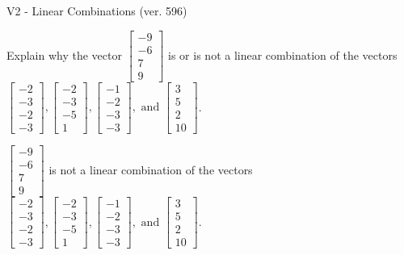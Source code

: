 \begin{exercise}
  \begin{exerciseTitle}V2 - Linear Combinations (ver. 596)\end{exerciseTitle}
  \begin{exerciseStatement}
    Explain why the vector \(\left[\begin{array}{c}
-9 \\
-6 \\
7 \\
9
\end{array}\right]\)  is or is not a linear 
	combination of the vectors \(\left[\begin{array}{c}
-2 \\
-3 \\
-2 \\
-3
\end{array}\right] , \left[\begin{array}{c}
-2 \\
-3 \\
-5 \\
1
\end{array}\right] , \left[\begin{array}{c}
-1 \\
-2 \\
-3 \\
-3
\end{array}\right] , \text{ and } \left[\begin{array}{c}
3 \\
5 \\
2 \\
10
\end{array}\right]\).
	


  \end{exerciseStatement}
  \begin{exerciseAnswer}
   \(\left[\begin{array}{c}
-9 \\
-6 \\
7 \\
9
\end{array}\right]\) 
  	 is not  
	a linear combination of the vectors \(\left[\begin{array}{c}
-2 \\
-3 \\
-2 \\
-3
\end{array}\right] , \left[\begin{array}{c}
-2 \\
-3 \\
-5 \\
1
\end{array}\right] , \left[\begin{array}{c}
-1 \\
-2 \\
-3 \\
-3
\end{array}\right] , \text{ and } \left[\begin{array}{c}
3 \\
5 \\
2 \\
10
\end{array}\right]\).


\end{exerciseAnswer}
\end{exercise}
